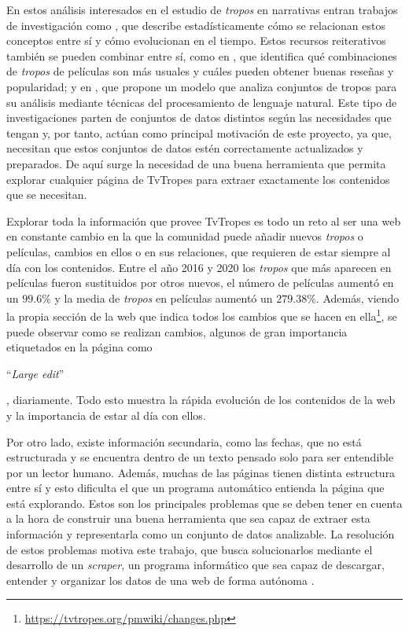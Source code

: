 En estos análisis interesados en el estudio de \textit{tropos} en narrativas
entran trabajos de investigación como \cite{garcia2020tropes}, que describe
estadísticamente cómo se relacionan estos conceptos entre sí y cómo evolucionan
en el tiempo. Estos recursos reiterativos también se pueden combinar entre sí,
como en \cite{garcia2021simpsons}, que identifica qué combinaciones de
\textit{tropos} de películas son más usuales y cuáles pueden obtener buenas
reseñas y popularidad; y en \cite{any2vec}, que propone un modelo que analiza
conjuntos de tropos para su análisis mediante técnicas del procesamiento de
lenguaje natural. Este tipo de investigaciones parten de conjuntos de datos
distintos según las necesidades que tengan y, por tanto, actúan como principal
motivación de este proyecto, ya que, necesitan que estos conjuntos de datos
estén correctamente actualizados y preparados. De aquí surge la necesidad de una
buena herramienta que permita explorar cualquier página de TvTropes para extraer
exactamente los contenidos que se necesitan.

Explorar toda la información que provee TvTropes es todo un reto al ser una web
en constante cambio en la que la comunidad puede añadir nuevos \textit{tropos} o
películas, cambios en ellos o en sus relaciones, que requieren de estar siempre
al día con los contenidos. Entre el año 2016 y 2020 los \textit{tropos} que más
aparecen en películas fueron sustituidos por otros nuevos, el número de
películas aumentó en un $99.6\%$ y la media de \textit{tropos} en películas
aumentó un $279.38\%$\cite{garcia2020tropes}. Además, viendo la propia sección
de la web que indica todos los cambios que se hacen en
ella\footnote{\url{https://tvtropes.org/pmwiki/changes.php}}, se puede observar
como se realizan cambios, algunos de gran importancia etiquetados en la página
como \begin{otherlanguage}{english}``\textit{Large edit}''\end{otherlanguage},
diariamente. Todo esto muestra la rápida evolución de los contenidos de la web y
la importancia de estar al día con ellos. 

Por otro lado, existe información secundaria, como las fechas, que no está
estructurada y se encuentra dentro de un texto pensado solo para ser entendible
por un lector humano. Además, muchas de las páginas tienen distinta estructura
entre sí y esto dificulta el que un programa automático entienda la página que
está explorando. Estos son los principales problemas que se deben tener en
cuenta a la hora de construir una buena herramienta que sea capaz de extraer
esta información y representarla como un conjunto de datos analizable. La
resolución de estos problemas motiva este trabajo, que busca solucionarlos
mediante el desarrollo de un \textit{scraper}, un programa informático que sea
capaz de descargar, entender y organizar los datos de una web de forma autónoma
\cite{apress2018scraping}.

